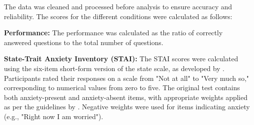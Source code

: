 The data was cleaned and processed before analysis to ensure accuracy and reliability. The scores for the different conditions were calculated as follows:

\begin{APAitemize}
\item \textbf{Performance:} The performance was calculated as the ratio of correctly answered questions to the total number of questions.
\item \textbf{State-Trait Anxiety Inventory (STAI):} The STAI scores were calculated using the six-item short-form version of the state scale, as developed by \textcite{marteauDevelopmentSixitemShortform1992}. Participants rated their responses on a scale from "Not at all" to "Very much so," corresponding to numerical values from zero to five. The original test contains both anxiety-present and anxiety-absent items, with appropriate weights applied as per the guidelines by \textcite{marteauDevelopmentSixitemShortform1992}. Negative weights were used for items indicating anxiety (e.g., "Right now I am worried").
\end{APAitemize}